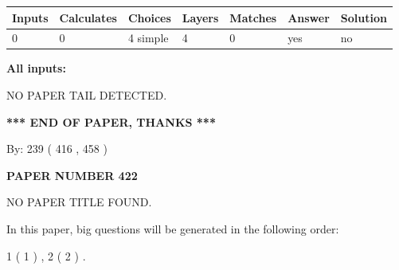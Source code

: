 \documentclass[12pt]{article}
\begin{document}
 
   
   
   
   
\noindent\begin{tabular}{|l|l|l|l|l|l|l|}
 \hline
Inputs & Calculates & Choices & Layers & Matches & Answer & Solution \\ \hline
 0  & 
 0  & 
 4
  simple  
  & 
 4  & 
 0  & 
  yes & 
  no 
  \\ \hline
 \end{tabular}
   
   
   
   
\noindent{}
   
   
   
   
\noindent\vspace{0.1in}\hspace{-0.08in} {\textbf{\Large{All inputs: }}}
   
   
   
   
\vspace{2.0in} NO PAPER TAIL DETECTED.
   
   
   
   
\vspace{1.0in} 
{\textbf{\large{ *** END OF PAPER, THANKS *** }}} 
   
   
\hspace{1.0in} By: 
 239 ( 416 ,  458 )
   
   
   
   
\newpage 
\setcounter{page}{ 
   422001 } 
   
   
   
   
 {\textbf{ \Large{ PAPER NUMBER  422  }}}
   
   
\vspace{0.2in}
   
   
   
   
   
   
 NO PAPER TITLE FOUND.
   
   
   
\vspace{0.2in}
   
In this paper, big questions will be generated in the following order: 
   
   
   1 ( 1 )
 ,
   2 ( 2 )
 .
  
\vspace{0.2in}
  
\end{document}
